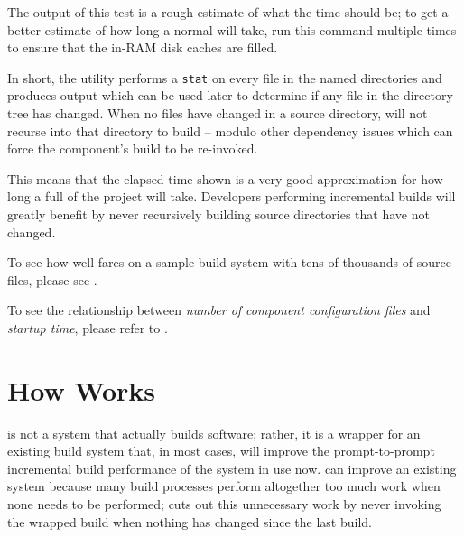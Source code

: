 \begin{center}\end{center}


The output of this test is a rough estimate of what the \nullbuild
time should be; to get a better estimate of how long a normal
\nullbuild will take, run this command multiple times to ensure that
the in-RAM disk caches are filled.

In short, the \mtree utility performs a \texttt{stat} on every file in
the named directories and produces output which can be used later to
determine if any file in the directory tree has changed.  When no
files have changed in a source directory, \lmsbw will not recurse into
that directory to build -- modulo other dependency issues which can
force the component's build to be re-invoked.

This means that the elapsed time shown is a very good approximation
for how long a full \nullbuild of the project will take.  Developers
performing incremental builds will greatly benefit by never
recursively building source directories that have not changed.

To see how well \lmsbw fares on a sample build system with tens of
thousands of source files, please see .

To see the relationship between \emph{number of component
  configuration files} and \emph{\lmsbw startup time}, please refer to
.

\section{How \lmsbw Works}

\lmsbw is not a system that actually builds software; rather, it is a
wrapper for an existing build system that, in most cases, will improve
the prompt-to-prompt incremental build performance of the system in
use now.  \lmsbw can improve an existing system because many build
processes perform altogether too much work when none needs to be
performed; \lmsbw cuts out this unnecessary work by never invoking the
wrapped build when nothing has changed since the last build.


